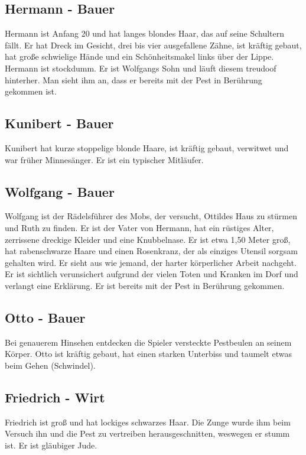 \subsection{Hermann - Bauer}

Hermann ist Anfang 20 und hat langes blondes Haar, das auf seine Schultern fällt. Er hat Dreck im Gesicht, drei bis vier ausgefallene Zähne, ist kräftig gebaut, hat große schwielige Hände und ein Schönheitsmakel links über der Lippe. Hermann ist stockdumm. Er ist Wolfgangs Sohn und läuft diesem treudoof hinterher. Man sieht ihm an, dass er bereits mit der Pest in Berührung gekommen ist.

\subsection{Kunibert - Bauer}

Kunibert hat kurze stoppelige blonde Haare, ist kräftig gebaut, verwitwet und war früher Minnesänger. Er ist ein typischer Mitläufer.

\subsection{Wolfgang - Bauer}

Wolfgang ist der Rädelsführer des Mobs, der versucht, Ottildes Haus zu stürmen und Ruth zu finden. Er ist der Vater von Hermann, hat ein rüstiges Alter, zerrissene dreckige Kleider und eine Knubbelnase. Er ist etwa 1,50 Meter groß, hat rabenschwarze Haare und einen Rosenkranz, der als einziges Utensil sorgsam gehalten wird. Er sieht aus wie jemand, der harter körperlicher Arbeit nachgeht. Er ist sichtlich verunsichert aufgrund der vielen Toten und Kranken im Dorf und verlangt eine Erklärung. Er ist bereits mit der Pest in Berührung gekommen.

\subsection{Otto - Bauer}

Bei genauerem Hinsehen entdecken die Spieler versteckte Pestbeulen an seinem Körper. Otto ist kräftig gebaut, hat einen starken Unterbiss und taumelt etwas beim Gehen (Schwindel).

\subsection{Friedrich - Wirt}

Friedrich ist groß und hat lockiges schwarzes Haar. Die Zunge wurde ihm beim Versuch ihn und die Pest zu vertreiben herausgeschnitten, weswegen er stumm ist. Er ist gläubiger Jude.

